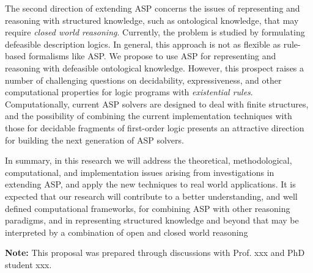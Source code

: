 \documentclass[12pt]{article}
\begin{document}
\vspace{.1in}
The second direction of extending ASP concerns the issues of representing and reasoning with structured knowledge, such as
ontological knowledge, that may require {\em closed world reasoning}. Currently, the problem is studied by formulating defeasible
description logics. In general, this approach is not as flexible as rule-based formalisms like ASP. We propose to use ASP for representing and reasoning with defeasible ontological knowledge. However, this prospect raises a number of challenging questions on decidability, expressiveness, and other computational properties for logic programs with {\em existential rules}. 
Computationally, current ASP solvers are designed to deal with finite structures, and the possibility of combining the current
implementation techniques with those for decidable fragments of first-order logic presents an attractive direction for building the next
generation of ASP solvers.

\vspace{.1in}
In summary, in this research we will address the theoretical, methodological, computational, and implementation issues arising from investigations in extending ASP, and apply the new techniques to real world applications. It is expected that our research will contribute
to a better understanding, and well defined computational frameworks, for combining ASP with other reasoning paradigms, and in representing structured knowledge and beyond that may be interpreted by a combination of open and closed world reasoning

\newpage
\noindent
{\bf Note: }  This proposal was prepared through discussions with Prof. xxx and PhD student xxx. 




\end{document}
